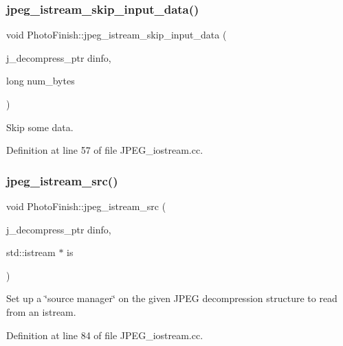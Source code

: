 \subsubsection{\texorpdfstring{jpeg\+\_\+istream\+\_\+skip\+\_\+input\+\_\+data()}{jpeg\_istream\_skip\_input\_data()}}
{\footnotesize\ttfamily void Photo\+Finish\+::jpeg\+\_\+istream\+\_\+skip\+\_\+input\+\_\+data (\begin{DoxyParamCaption}\item[{j\+\_\+decompress\+\_\+ptr}]{dinfo,  }\item[{long}]{num\+\_\+bytes }\end{DoxyParamCaption})}



Skip some data. 



Definition at line 57 of file J\+P\+E\+G\+\_\+iostream.\+cc.

\mbox{\label{namespace_photo_finish_a18ffc326d36fb31d16a6468b4bfc4715}} 
\subsubsection{\texorpdfstring{jpeg\+\_\+istream\+\_\+src()}{jpeg\_istream\_src()}}
{\footnotesize\ttfamily void Photo\+Finish\+::jpeg\+\_\+istream\+\_\+src (\begin{DoxyParamCaption}\item[{j\+\_\+decompress\+\_\+ptr}]{dinfo,  }\item[{std\+::istream $\ast$}]{is }\end{DoxyParamCaption})}



Set up a \char`\"{}source manager\char`\"{} on the given J\+P\+EG decompression structure to read from an istream. 



Definition at line 84 of file J\+P\+E\+G\+\_\+iostream.\+cc.

\mbox{\label{namespace_photo_finish_aca76b52b734af33c592f35e545811952}} 
